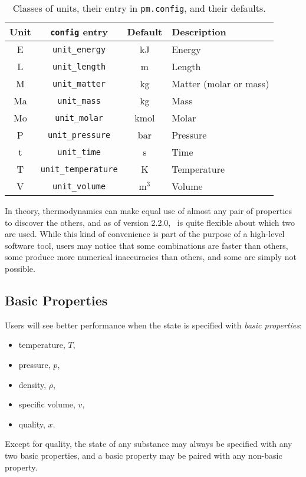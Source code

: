 \begin{table}
\centering
\caption{Classes of units, their entry in \texttt{pm.config}, and their defaults.}\label{tab:units}
\begin{tabular}{|cccl|}
\hline
Unit & \verb|config| entry & Default & Description\\
\hline
E & \verb|unit_energy| & kJ & Energy\\
L & \verb|unit_length| & m & Length\\
M & \verb|unit_matter| & kg & Matter (molar or mass)\\
Ma & \verb|unit_mass| & kg & Mass\\
Mo & \verb|unit_molar| & kmol & Molar\\
P & \verb|unit_pressure| & bar & Pressure\\
t & \verb|unit_time| & s & Time\\
T & \verb|unit_temperature| & K & Temperature\\
V & \verb|unit_volume| & m$^3$ & Volume\\
\hline
\end{tabular}
\end{table}

In theory, thermodynamics can make equal use of almost any pair of properties to discover the others, and as of version 2.2.0, \PM\ is quite flexible about which two are used.  While this kind of convenience is part of the purpose of a high-level software tool, users may notice that some combinations are faster than others, some produce more numerical inaccuracies than others, and some are simply not possible.

\subsection{Basic Properties}\label{sec:intro:basic}

Users will see better performance when the state is specified with \emph{basic properties}:
\begin{itemize}
\item temperature, $T$,
\item pressure, $p$,
\item density, $\rho$,
\item specific volume, $v$,
\item quality, $x$.
\end{itemize}
Except for quality, the state of any substance may always be specified with any two basic properties, and a basic property may be paired with any non-basic property.

